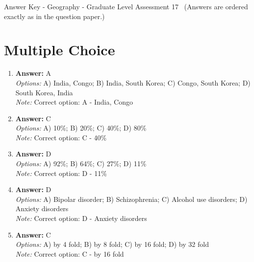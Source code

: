 \documentclass[12pt]{article}
\begin{document}
\begin{center}
Answer Key - Geography - Graduate Level Assessment 17 \
\small (Answers are ordered exactly as in the question paper.)
\end{center}

\section*{Multiple Choice}
\begin{enumerate}[label=\arabic*.]
\item \textbf{Answer:} A
\\ \textit{Options:} A) India, Congo; B) India, South Korea; C) Congo, South Korea; D) South Korea, India
\\ \textit{Note:} Correct option: A - India, Congo
\item \textbf{Answer:} C
\\ \textit{Options:} A) 10\%; B) 20\%; C) 40\%; D) 80\%
\\ \textit{Note:} Correct option: C - 40\%
\item \textbf{Answer:} D
\\ \textit{Options:} A) 92\%; B) 64\%; C) 27\%; D) 11\%
\\ \textit{Note:} Correct option: D - 11\%
\item \textbf{Answer:} D
\\ \textit{Options:} A) Bipolar disorder; B) Schizophrenia; C) Alcohol use disorders; D) Anxiety disorders
\\ \textit{Note:} Correct option: D - Anxiety disorders
\item \textbf{Answer:} C
\\ \textit{Options:} A) by 4 fold; B) by 8 fold; C) by 16 fold; D) by 32 fold
\\ \textit{Note:} Correct option: C - by 16 fold
\end{enumerate}
\end{document}
